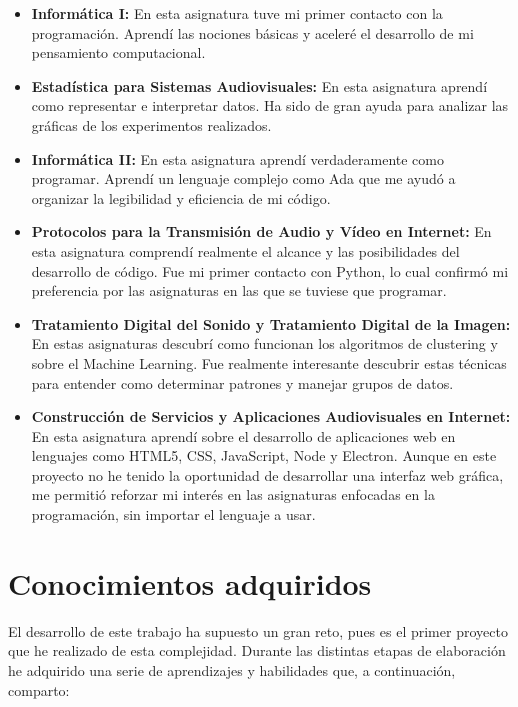 \documentclass[a4paper, 12pt]{book}
\begin{document}
\begin{itemize}
\item \textbf{Informática I:} En esta asignatura tuve mi primer contacto con la programación. Aprendí las nociones básicas y aceleré el desarrollo de mi pensamiento computacional.
\item \textbf{Estadística para Sistemas Audiovisuales:} En esta asignatura aprendí como representar e interpretar datos. Ha sido de gran ayuda para analizar las gráficas de los experimentos realizados.
\item \textbf{Informática II:} En esta asignatura aprendí verdaderamente como programar. Aprendí un lenguaje complejo como Ada que me ayudó a organizar la legibilidad y eficiencia de mi código. 
\item \textbf{Protocolos para la Transmisión de Audio y Vídeo en Internet:} En esta asignatura comprendí realmente el alcance y las posibilidades del desarrollo de código. Fue mi primer contacto con Python, lo cual confirmó mi preferencia por las asignaturas en las que se tuviese que programar.
\item \textbf{Tratamiento Digital del Sonido y Tratamiento Digital de la Imagen:} En estas asignaturas descubrí como funcionan los algoritmos de clustering y sobre el Machine Learning. Fue realmente interesante descubrir estas técnicas para entender como determinar patrones y manejar grupos de datos.
\item \textbf{Construcción de Servicios y Aplicaciones Audiovisuales en Internet:} En esta asignatura aprendí sobre el desarrollo de aplicaciones web en lenguajes como HTML5, CSS, JavaScript, Node y Electron. Aunque en este proyecto no he tenido la oportunidad de desarrollar una interfaz web gráfica, me permitió reforzar mi interés en las asignaturas enfocadas en la programación, sin importar el lenguaje a usar.
\end{itemize}

\section{Conocimientos adquiridos}
\label{sec:aprendizaje}

El desarrollo de este trabajo ha supuesto un gran reto, pues es el primer proyecto que he realizado de esta complejidad. Durante las distintas etapas de elaboración he adquirido una serie de aprendizajes y habilidades que, a continuación, comparto:
\end{document}
